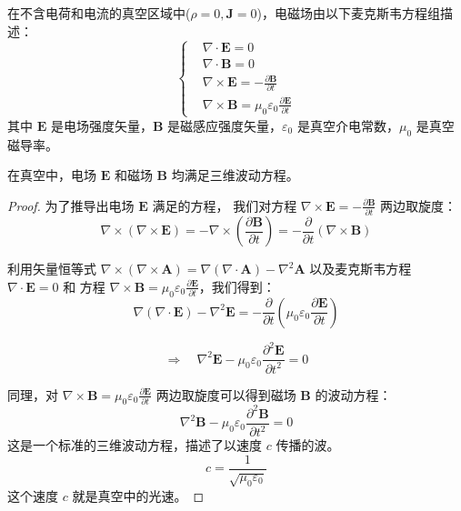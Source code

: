 \documentclass[fontset=none]{ctexart}
\begin{document}
\begin{theorem}[真空中的麦克斯韦方程组]
在不含电荷和电流的真空区域中($\rho=0, \bm{J}=0$)，电磁场由以下麦克斯韦方程组描述：
\begin{equation}    
    \left\{
    \begin{aligned}
    &\nabla \cdot \bm{E} = 0 \\
    &\nabla \cdot \bm{B} = 0 \\
    &\nabla \times \bm{E} = -\frac{\partial \bm{B}}{\partial t}  \\
    &\nabla \times \bm{B} = \mu_0 \varepsilon_0 \frac{\partial \bm{E}}{\partial t}
    \end{aligned}
    \right.
\end{equation}
其中 $\bm{E}$ 是电场强度矢量，$\bm{B}$ 是磁感应强度矢量，$\varepsilon_0$ 是真空介电常数，$\mu_0$ 是真空磁导率。
\end{theorem}

\begin{theorem}[电磁波的波动方程]
在真空中，电场 $\bm{E}$ 和磁场 $\bm{B}$ 均满足三维波动方程。
\end{theorem}

\begin{proof}
为了推导出电场 $\bm{E}$ 满足的方程，
我们对方程 $\nabla \times \bm{E} = -\frac{\partial \bm{B}}{\partial t}$ 两边取旋度：
\begin{equation}
\nabla \times (\nabla \times \bm{E}) 
= -\nabla \times \left(\frac{\partial \bm{B}}{\partial t}\right) 
= -\frac{\partial}{\partial t}(\nabla \times \bm{B})
\end{equation}

利用矢量恒等式 $\nabla \times (\nabla \times \bm{A}) = \nabla(\nabla \cdot \bm{A}) - \nabla^2 \bm{A}$ 
以及麦克斯韦方程 $\nabla \cdot \bm{E} = 0$ 和
方程 $\nabla \times \bm{B} = \mu_0 \varepsilon_0 \frac{\partial \bm{E}}{\partial t}$，我们得到：
\begin{equation}
\nabla(\nabla \cdot \bm{E}) - \nabla^2 \bm{E} 
= -\frac{\partial}{\partial t}\left(\mu_0 \varepsilon_0 \frac{\partial \bm{E}}{\partial t}\right)
\end{equation}

\begin{equation}
\Rightarrow \quad \nabla^2 \bm{E} - \mu_0 \varepsilon_0 \frac{\partial^2 \bm{E}}{\partial t^2} = 0
\end{equation}

同理，对 $\nabla \times \bm{B} = \mu_0 \varepsilon_0 \frac{\partial \bm{E}}{\partial t}$ 
两边取旋度可以得到磁场 $\bm{B}$ 的波动方程：
\begin{equation}
\nabla^2 \bm{B} - \mu_0 \varepsilon_0 \frac{\partial^2 \bm{B}}{\partial t^2} = 0
\end{equation}
这是一个标准的三维波动方程，描述了以速度 $c$ 传播的波。
\begin{equation}
c = \frac{1}{\sqrt{\mu_0 \varepsilon_0}}
\end{equation}
这个速度 $c$ 就是真空中的光速。
\end{proof}
\end{document}
